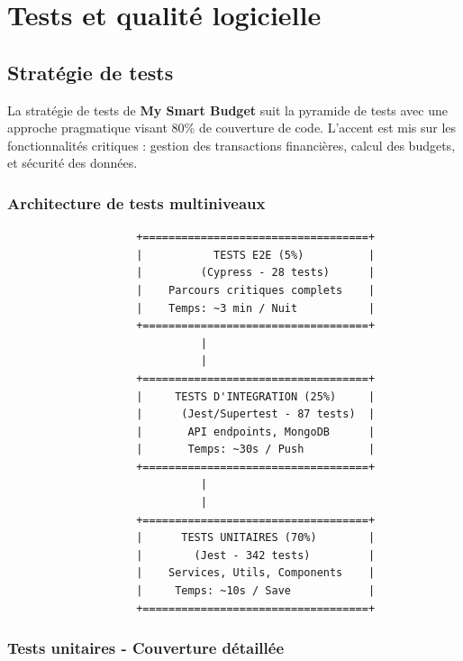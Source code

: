 \chapter{Tests et qualité logicielle}

\section{Stratégie de tests}

La stratégie de tests de \textbf{My Smart Budget} suit la pyramide de tests avec une approche pragmatique visant 80\% de couverture de code. L'accent est mis sur les fonctionnalités critiques : gestion des transactions financières, calcul des budgets, et sécurité des données.

\subsection{Architecture de tests multiniveaux}

\begin{tcolorbox}[colback=blue!5!white,colframe=blue!60!black,title=\textbf{Pyramide de tests My Smart Budget}]
\begin{verbatim}
                    +===================================+
                    |           TESTS E2E (5%)          |
                    |         (Cypress - 28 tests)      |
                    |    Parcours critiques complets    |
                    |    Temps: ~3 min / Nuit           |
                    +===================================+
                              |
                              |
                    +===================================+
                    |     TESTS D'INTEGRATION (25%)     |
                    |      (Jest/Supertest - 87 tests)  |
                    |       API endpoints, MongoDB      |
                    |       Temps: ~30s / Push          |
                    +===================================+
                              |
                              |
                    +===================================+
                    |      TESTS UNITAIRES (70%)        |
                    |        (Jest - 342 tests)         |
                    |    Services, Utils, Components    |
                    |     Temps: ~10s / Save            |
                    +===================================+
\end{verbatim}
\end{tcolorbox}

\subsection{Tests unitaires - Couverture détaillée}

